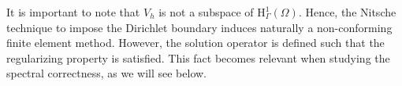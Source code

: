 \documentclass[onefignum,onetabnum,final]{siamart250211}
\numberwithin{equation}{section}
\newcommand\0{\boldsymbol{0}}
\renewcommand\O{\Omega}
\newcommand\G{\Gamma}
\renewcommand\H{\mathrm{H}}
\begin{document}
	\begin{remark}
		It is important to note that  $V_h$ is not a subspace of $\H^{1}_\G(\Omega)$. Hence, the Nitsche technique to impose the Dirichlet boundary induces naturally a non-conforming finite element method. However, the solution operator is defined such that the regularizing property is satisfied. This fact becomes relevant when studying the spectral correctness, as we will see below.
	\end{remark}
	
	
	
\end{document}
